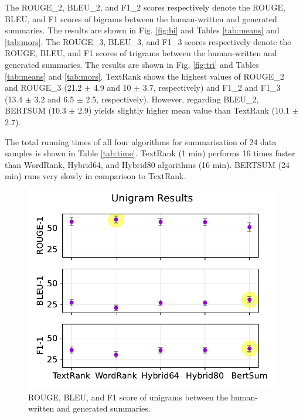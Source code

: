 \documentclass[11pt]{article}
\begin{document}
The ROUGE\_2, BLEU\_2, and F1\_2 scores respectively denote the ROUGE, BLEU, and F1 scores of bigrams between the human-written and generated summaries. The results are shown in Fig. \ref{fig:bi} and Tables \ref{tab:means} and \ref{tab:mors}. The ROUGE\_3, BLEU\_3, and F1\_3 scores respectively denote the ROUGE, BLEU, and F1 scores of trigrams between the human-written and generated summaries. The results are shown in Fig. \ref{fig:tri} and Tables \ref{tab:means} and \ref{tab:mors}. TextRank shows the highest values of ROUGE\_2 and ROUGE\_3 (21.2 $\pm$ 4.9 and 10 $\pm$ 3.7, respectively) and F1\_2 and F1\_3 (13.4 $\pm$ 3.2 and 6.5 $\pm$ 2.5, respectively). However, regarding BLEU\_2, BERTSUM (10.3 $\pm$ 2.9) yields slightly higher mean value than TextRank (10.1 $\pm$ 2.7). 

The total running times of all four algorithms for summarisation of 24 data samples is shown in Table \ref{tab:time}. TextRank (1 min) performs 16 times faster than WordRank, Hybrid64, and Hybrid80 algorithms (16 min). BERTSUM (24 min) runs very slowly in comparison to TextRank.

\begin{figure}[!h]
\centering
\includegraphics[scale = 0.5]{../figures/unigrams.pdf}
\caption{ROUGE, BLEU, and F1 score of unigrams between the human-written and generated summaries.\label{fig:uni}}
\end{figure}
\end{document}
